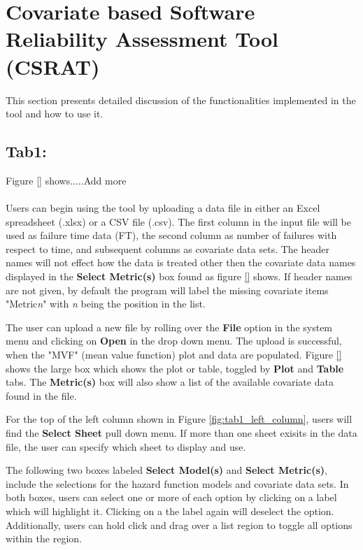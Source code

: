 \documentclass[conference]{IEEEtran}
\begin{document}
\section{Covariate based Software Reliability Assessment Tool (CSRAT)}\label{sec:SRAT}
This section presents detailed discussion of the functionalities implemented in the tool and how to use it.

\subsection{Tab1: }\label{sec:Tab1}
Figure \ref{} shows.....Add more
\\
\\
Users can begin using the tool by uploading a data file in either an Excel spreadsheet (.xlsx) or a CSV file (.csv). The first column in the input file will be used as failure time data (FT), the second column as number of failures with respect to time, and subsequent columns as covariate data sets. The header names will not effect how the data is treated other then the covariate data names displayed in the \textbf{Select Metric(s)} box found as figure \ref{} shows. If header names are not given, by default the program will label the missing covariate items "Metric\textit{n}" with \textit{n} being the position in the list.


The user can upload a new file by rolling over the \textbf{File} option in the system menu and clicking on \textbf{Open} in the drop down menu. The upload is successful, when the "MVF" (mean value function) plot and data are populated. Figure \ref{} shows the large box which shows the plot or table, toggled by \textbf{Plot} and \textbf{Table} tabs. The \textbf{Metric(s)} box will also show a list of the available covariate data found in the file.

For the top of the left column shown in Figure \ref{fig:tab1_left_column}, users will find the \textbf{Select Sheet} pull down menu. If more than one sheet exisits in the data file, the user can specify which sheet to display and use. 

The following two boxes labeled \textbf{Select Model(s)} and \textbf{Select Metric(s)}, include the selections for the hazard function models and covariate data sets. In both boxes, users can select one or more of each option by clicking on a label which will highlight it. Clicking on a the label again will deselect the option. Additionally, users can hold click and drag over a list region to toggle all options within the region.
\end{document}
